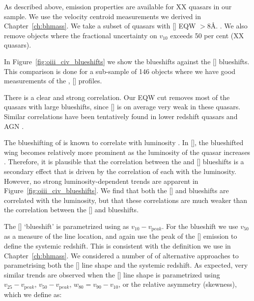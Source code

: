 As described above,  emission properties are available for XX quasars in our sample. 
We use the  velocity centroid measurements we derived in Chapter~\ref{ch:bhmass}.
We take a subset of quasars with [] \ac{EQW} $>8$\AA. 
. 
We also remove objects where the fractional uncertainty on $v_{10}$ exceeds 50 per cent (XX quasars). 

In Figure~\ref{fig:oiii_civ_blueshifts} we show the  blueshifts against the [] blueshifts.
This comparison is done for a sub-sample of 146 objects where we have good measurements of the , [] profiles. 

There is a clear and strong correlation. 
Our EQW cut removes most of the quasars with large  blueshifts, since [] is on average very weak in these quasars. 
Similar correlations have been tentatively found in lower redshift quasars and \ac{AGN} \citep{zamanov02}. 

The blueshifting of  is known to correlate with luminosity \citep{richards11}.
In [], the blueshifted wing becomes relatively more prominent as the luminosity of the quasar increases \citep{shen14}. 
Therefore, it is plausible that the correlation between the  and [] blueshifts is a secondary effect that is driven by the correlation of each with the luminosity. 
However, no strong luminosity-dependent trends are apparent in Figure~\ref{fig:oiii_civ_blueshifts}. 
We find that both the [] and  blueshifts are correlated with the luminosity, but that these correlations are much weaker than the correlation between the [] and  blueshifts. 



The [] `blueshift' is parametrized using as $v_{10} - v_{\mathrm peak}$.
For the  blueshift we use $v_{50}$ as a measure of the line location, and again use the peak of the [] emission to define the systemic redshift. 
This is consistent with the definition we use in Chapter~\ref{ch:bhmass}. 
We considered a number of of alternative approaches to parametrising both the [] line shape and the systemic redshift. 
As expected, very similar trends are observed when the [] line shape is parametrized using $v_{25} - v_{\mathrm peak}$, $v_{50} - v_{\mathrm peak}$, $w_{80} = v_{90} - v_{10}$, or the relative asymmetry (skewness), which we define as:

